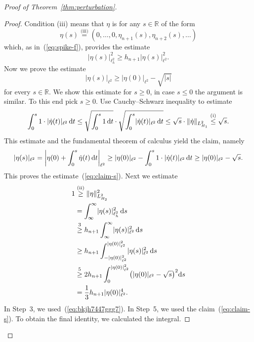 \documentclass[pdftex]{sigma}
\numberwithin{equation}{section}
\newcommand{\R}{{\mathbb{R}}}
\newcommand{\norm}{{\rm norm}}
\def\abs#1{\mathopen|#1\mathclose|}
\def\Abs#1{\left|#1\right|}
\def\norm#1{\mathopen\|#1\mathclose\|}
\newcommand{\1}{{{\mathchoice {\rm 1\mskip-4mu l} {\rm 1\mskip-4mu l}
{\rm 1\mskip-4.5mu l} {\rm 1\mskip-5mu l}}}}
\begin{document}
\begin{proof}[Proof of Theorem~\ref{thm:perturbation}]
\begin{proof}
Condition (iii) means that $\eta$ is for any $s\in\R$ of the form
\[
 \eta(s)
 \stackrel{\text{(iii)}}{=}
 (0,\dots,0,\eta_{n+1}(s),\eta_{n+2}(s),\dots )
\]
which, as in~(\ref{eq:spike-f}), provides the estimate
\begin{equation}\label{eq:bkjh7447ggg7}
 \abs{\eta(s)}_{\ell^2_h}^2
 \ge h_{n+1}\abs{\eta(s)}_{\ell^2}^2 .
\end{equation}
Now we prove the estimate
\begin{equation}\label{eq:claim-s}
 \abs{\eta(s)}_{\ell^2}
 \ge \abs{\eta(0)}_{\ell^2}-\sqrt{\abs{s}}
\end{equation}
for every $s\in\R$.
We show this estimate for $s\ge0$, in case $s\le0$ the argument is similar.
To this end pick $s\ge0$. Use Cauchy--Schwarz inequality to estimate
\[
 \int_0^s 1\cdot \abs{\dot \eta(t)}_{\ell^2}\, {\rm d}t
 \le\sqrt{\int_0^s 1\, {\rm d}t}\cdot
 \sqrt{\int_0^s \abs{\dot \eta(t)}_{\ell^2}\, {\rm d}t}
 \le \sqrt{s}\cdot\norm{\dot\eta}_{L^2_{H_1}}
 \stackrel{\text{(i)}}{\le}\sqrt{s} .
\]
This estimate and the fundamental theorem of calculus
yield the claim, namely
\begin{gather*}
 \abs{\eta(s)}_{\ell^2}
 =\Abs{\eta(0)+\int_0^s\dot\eta(t)\, {\rm d}t}_{\ell^2}
 \ge \abs{\eta(0)}_{\ell^2}
 -\int_0^s 1\cdot \abs{\dot \eta(t)}_{\ell^2}\, {\rm d}t
 \ge \abs{\eta(0)}_{\ell^2}-\sqrt{s} .
\end{gather*}
This proves the estimate~(\ref{eq:claim-s}).
Next we estimate
\begin{equation*}
\begin{split}
 1
 &\stackrel{\text{(ii)}}{\ge}\norm{\eta}_{L^2_{H_2}}^2\\
 &=\int_{\infty}^\infty\abs{\eta(s)}_{\ell^2_h}^2\, {\rm d}s\\
 &\stackrel{3}{\ge} h_{n+1}\int_{\infty}^\infty\abs{\eta(s)}_{\ell^2}^2\, {\rm d}s\\
 &\ge h_{n+1}\int_{-\abs{\eta(0)}_{\ell^2}^2}^{\abs{\eta(0)}_{\ell^2}^2}
 \abs{\eta(s)}_{\ell^2}^2\, {\rm d}s\\
 &\stackrel{5}{\ge} 2h_{n+1}\int_0^{\abs{\eta(0)}_{\ell^2}^2}
 \bigl(\abs{\eta(0)}_{\ell^2}-\sqrt{s} \bigr)^2 {\rm d}s\\
 &=\frac{1}{3} h_{n+1} \abs{\eta(0)}_{\ell^2}^4.
\end{split}
\end{equation*}
In Step~3, we used~(\ref{eq:bkjh7447ggg7}).
In Step~5, we used the claim~(\ref{eq:claim-s}).
To obtain the final identity, we calculated the integral.


\end{proof}
\end{proof}
\end{document}

